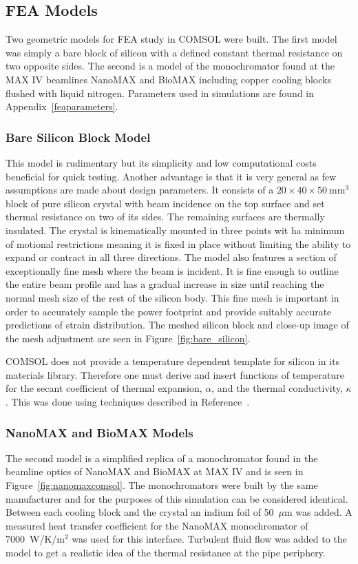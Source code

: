 \documentclass[preprint]{iucr}              %
\begin{document}
\subsection{FEA Models}

Two geometric models for FEA study in COMSOL were built. The first model was simply a bare block of silicon with a defined constant thermal resistance on two opposite sides. The second is a model of the monochromator found at the MAX IV beamlines NanoMAX and BioMAX including copper cooling blocks flushed with liquid nitrogen. Parameters used in simulations are found in Appendix~\ref{feaparameters}.

\subsubsection{Bare Silicon Block Model}
This model is rudimentary but its simplicity and low computational costs beneficial for quick testing. Another advantage is that it is very general as few assumptions are made about design parameters. It consists of a $20\times 40\times 50~$mm$^3$ block of pure silicon crystal with beam incidence on the top surface and set thermal resistance on two of its sides. The remaining surfaces are thermally insulated. The crystal is kinematically mounted in three points wit ha minimum of motional restrictions meaning it is fixed in place without limiting the ability to expand or contract in all three directions. The model also features a section of exceptionally fine mesh where the beam is incident. It is fine enough to outline the entire beam profile and has a gradual increase in size until reaching the normal mesh size of the rest of the silicon body. This fine mesh is important in order to accurately sample the power footprint and provide suitably accurate predictions of strain distribution. The meshed silicon block and close-up image of the mesh adjustment are seen in Figure~\ref{fig:bare_silicon}.

COMSOL does not provide a temperature dependent template for silicon in its materials library. Therefore one must derive and insert functions of temperature for the secant coefficient of thermal expansion, $\alpha$, and the thermal conductivity, $\kappa$. This was done using techniques described in Reference~\cite{mash}.

\subsubsection{NanoMAX and BioMAX Models}\label{feamodels}
The second model is a simplified replica of a monochromator found in the beamline optics of NanoMAX and BioMAX at MAX IV and is seen in Figure~\ref{fig:nanomaxcomsol}. The monochromators were built by the same manufacturer and for the purposes of this simulation can be considered identical. Between each cooling block and the crystal an indium foil of 50~$\mu$m was added. A measured heat transfer coefficient for the NanoMAX monochromator of 7000~W/K/m$^{2}$ was used for this interface. Turbulent fluid flow was added to the model to get a realistic idea of the thermal resistance at the pipe periphery.
\end{document}
